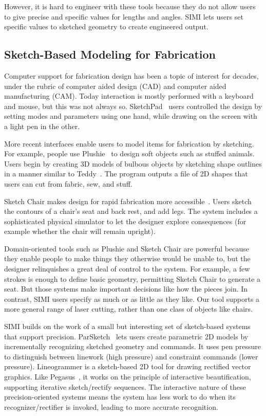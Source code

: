 \documentclass{article}
\begin{document}
However, it is hard to engineer with these tools because they do not
allow users to give precise and specific values for lengths and
angles. SIMI lets users set specific values to sketched geometry to
create engineered output.

\subsection{Sketch-Based Modeling for Fabrication}

Computer support for fabrication design has been a topic of interest
for decades, under the rubric of computer aided design (CAD) and
computer aided manufacturing (CAM). Today interaction is mostly
performed with a keyboard and mouse, but this was not always
so. SketchPad~\cite{sutherland-sketchpad} users controlled the design
by setting modes and parameters using one hand, while drawing on the
screen with a light pen in the other.

More recent interfaces enable users to model items for fabrication by
sketching. For example, people use Plushie~\cite{mori-plushie} to
design soft objects such as stuffed animals. Users begin by creating
3D models of bulbous objects by sketching shape outlines in a manner
similar to Teddy~\cite{igarashi-teddy}. The program outputs a file of
2D shapes that users can cut from fabric, sew, and stuff.

Sketch Chair makes design for rapid fabrication more
accessible~\cite{saul-sketch-chair}. Users sketch the contours of a
chair's seat and back rest, and add legs. The system includes a
sophisticated physical simulator to let the designer explore
consequences (for example whether the chair will remain upright).

Domain-oriented tools such as Plushie and Sketch Chair are powerful
because they enable people to make things they otherwise would be
unable to, but the designer relinquishes a great deal of control to
the system. For example, a few strokes is enough to define basic
geometry, permitting Sketch Chair to generate a seat. But those
systems make important decisions like how the pieces join. In
contrast, SIMI users specify as much or as little as they like. Our
tool supports a more general range of laser cutting, rather than one
class of objects like chairs.

SIMI builds on the work of a small but interesting set of sketch-based
systems that support precision.  ParSketch~\cite{naya-parsketch} lets
users create parametric 2D models by incrementally recognizing
sketched geometry and commands. It uses pen pressure to distinguish
between linework (high pressure) and constraint commands (lower
pressure). Lineogrammer\cite{zeleznik-lineogrammer} is a sketch-based
2D tool for drawing rectified vector graphics. Like
Pegasus~\cite{igarashi-pegasus}, it works on the principle of
interactive beautification, supporting iterative sketch/rectify
sequences. The interactive nature of these precision-oriented systems
means the system has less work to do when its recognizer/rectifier is
invoked, leading to more accurate recognition.
\end{document}
